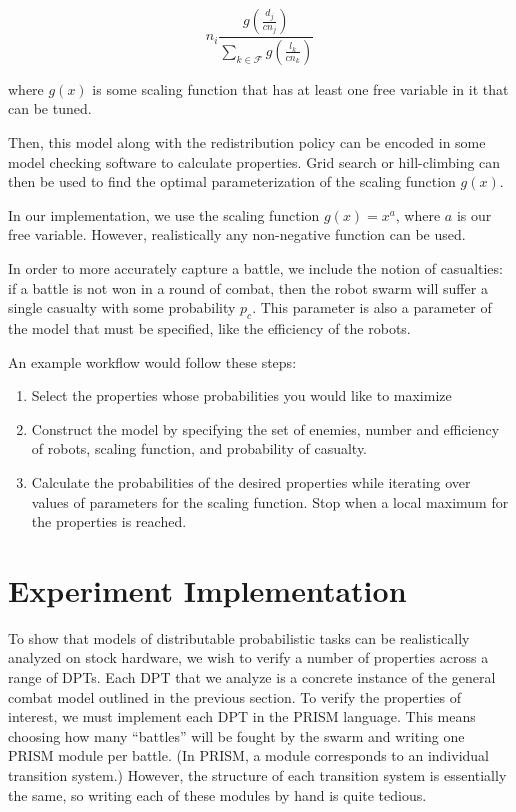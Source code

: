 \documentclass[11pt]{article}
\theoremstyle{definition}
\begin{document}
$$ n_i \frac{g(\frac{d_j}{cn_j})}{\displaystyle\sum_{k \in \mathcal{F}}g(\frac{l_k}{cn_k})} $$

where $ g(x) $ is some scaling function that has at least
one free variable in it that can be tuned.

Then, this model along with the redistribution
policy can be encoded in some model checking software
to calculate properties. Grid search or hill-climbing can
then be used to find the optimal parameterization of
the scaling function $ g(x) $.

In our implementation, we use the scaling function
$ g(x) = x^a $, where $ a $ is our free variable.
However, realistically any non-negative function
can be used.

In order to more accurately capture a battle, we include
the notion of casualties: if a battle is not won in a round
of combat, then the robot swarm will suffer
a single casualty with some probability $ p_c $.
This parameter is also a parameter of the model
that must be specified, like the efficiency of the robots.

An example workflow would follow these steps:

\begin{enumerate}
    \item Select the properties whose probabilities
        you would like to maximize
    \item Construct the model by specifying
        the set of enemies, number and efficiency of robots,
        scaling function, and probability of casualty.
    \item Calculate the probabilities of the
        desired properties while iterating over
        values of parameters for the scaling function.
        Stop when a local maximum for the properties is
        reached.
\end{enumerate}

\section{Experiment Implementation}
\label{sec:implementation}

To show that models of distributable probabilistic tasks can be realistically
analyzed on stock hardware, we wish to verify a number of properties across a
range of DPTs.
Each DPT that we analyze is a concrete instance of the general combat model
outlined in the previous section.
To verify the properties of interest, we must implement each DPT in the PRISM
language.
This means choosing how many ``battles'' will be fought by the swarm and
writing one PRISM module per battle.
(In PRISM, a module corresponds to an individual transition system.)
However, the structure of each transition system is essentially the same, so
writing each of these modules by hand is quite tedious.
\end{document}
